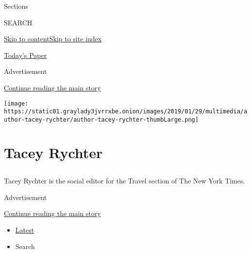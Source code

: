 Sections

SEARCH

\protect\hyperlink{site-content}{Skip to
content}\protect\hyperlink{site-index}{Skip to site index}

\href{https://myaccount.nytimes3xbfgragh.onion/auth/login?response_type=cookie\&client_id=vi}{}

\href{https://www.nytimes3xbfgragh.onion/section/todayspaper}{Today's
Paper}

Advertisement

\protect\hyperlink{after-top}{Continue reading the main story}

\texttt{[image: https://static01.graylady3jvrrxbe.onion/images/2019/01/29/multimedia/author-tacey-rychter/author-tacey-rychter-thumbLarge.png]}

\hypertarget{tacey-rychter}{%
\section{Tacey Rychter}\label{tacey-rychter}}

\subsection{}

Tacey Rychter is the social editor for the Travel section of The New
York Times.

Advertisement

\protect\hyperlink{after-mid1}{Continue reading the main story}

\begin{itemize}
\tightlist
\item
  \protect\hyperlink{stream-panel}{Latest}
\item
  Search
\end{itemize}

